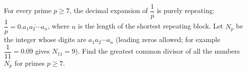For every prime $p\ge7$, the decimal expansion of $\dfrac1p$ is purely repeating: $\dfrac1p=0.\overline{a_1a_2\cdots a_n}$, where $n$ is the length of the shortest repeating block. Let $N_p$ be the integer whose digits are $a_1a_2\cdots a_n$ (leading zeros allowed; for example $\dfrac1{11}=0.\overline{09}$ gives $N_{11}=9$). Find the greatest common divisor of all the numbers $N_p$ for primes $p\ge7$.
